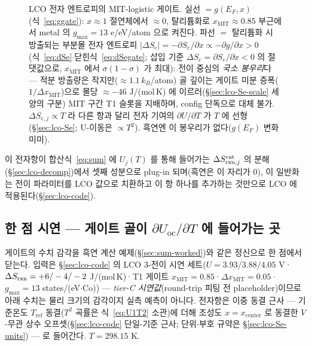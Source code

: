 \begin{figure}[t]
\begin{tikzpicture}[x=7.2cm,y=1.0cm]
\end{tikzpicture}
\caption{LCO 전자 엔트로피의 MIT-logistic 게이트. 실선 $=g(E_F,x)$(식~\eqref{eq:ggate}): $x\!\approx\!1$
절연체에서 $\approx0$, 탈리튬화로 $x_\mathrm{MIT}\!\approx\!0.85$ 부근에서 metal 의 $g_{\max}\!=\!13$ e/eV/atom 으로 켜진다.
파선 $=$ 탈리튬화 시 방출되는 부분몰 전자 엔트로피 $|\Delta S_e|=-\partial S_e/\partial x\propto-\partial g/\partial x>0$
(식~\eqref{eq:dSe}$\cdot$닫힌식~\eqref{eq:dSegate}; 삽입 기준 $\Delta S_e=\partial S_e/\partial x<0$ 의 절댓값으로,
$x_\mathrm{MIT}$ 에서 $\sigma(1-\sigma)$ 가 최대): 전이 중심의 \emph{국소
봉우리}다 --- 적분 방출량은 작지만($\approx1.1\,k_B$/atom) 골 깊이는 게이트 미분 증폭($1/\Delta x_\mathrm{MIT}$)으로 몰당 $\approx-46$ J/(mol\,K) 에 이르러(\S\ref{sec:lco-Se-scale} 세 양의 구분) MIT 구간 T1 슬롯을 지배하며, config 단독으로 대체 불가.
$\Delta S_{e,j}\propto T$ 라 다른 항과 달리 전자 기여의 $\partial U/\partial T$ 가 $T$ 에 선형(\S\ref{sec:lco-Se}; U-이동은
$\propto T^2$). 흑연엔 이 봉우리가 없다($g(E_F)$ 변화 미미).}
\label{fig:lco-electronic}
\end{figure}

이 전자항이 합산식~\eqref{eq:sum} 에 $U_j(T)$ 를 통해 들어가는 $\Delta S_{\mathrm{rxn},j}^\mathrm{cat}$ 의 분해
(\S\ref{sec:lco-decomp})에서 셋째 성분으로 plug-in 되며(흑연은 이 자리가 0),
이 일반화는 전이 파라미터를 LCO 값으로 치환하고 이 항 하나를 추가하는 것만으로 LCO 에 적용된다(\S\ref{sec:lco-code}).

\subsection{한 점 시연 --- 게이트 골이 $\partial U_\mathrm{oc}/\partial T$ 에 들어가는 곳}\label{sec:lco-worked}
게이트의 수치 감각을 흑연 계산 예제(\S\ref{sec:sum-worked})와 같은 정신으로 한 점에서 닫는다. 입력은
\S\ref{sec:lco-code} 의 LCO 3-전이 시연 세트($U=3.93/3.88/4.05$ V·$\Delta S_{\mathrm{rxn}}=+6/-4/-2$
J/(mol\,K)·T1 게이트 $x_\mathrm{MIT}=0.85$·$\Delta x_\mathrm{MIT}=0.05$·$g_\mathrm{max}=13$
states/(eV$\cdot$Co)) --- \emph{tier-C 시연값}(round-trip 피팅 전 placeholder)이므로 아래 수치는 물리
크기의 감각이지 실측 예측이 아니다. 전자항은 이중 동결 근사 --- 기준온도 $T_\mathrm{ref}$ 동결($T^2$
곡률은 식~\eqref{eq:U1T2} 소관)에 더해 조성도 $x{=}x_\mathrm{center}$ 로 동결한 $V$-무관 상수
오프셋(\S\ref{sec:lco-code} 단일-기준 근사; 단위$\cdot$부호 규약은 \S\ref{sec:lco-Se-units}) --- 로
들어간다. $T=298.15$ K.

